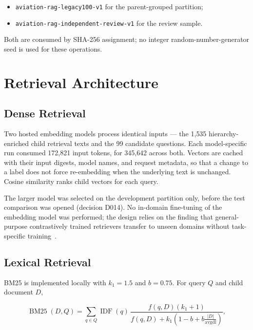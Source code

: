\begin{itemize}
  \item \texttt{aviation-rag-legacy100-v1} for the parent-grouped partition;
  \item \texttt{aviation-rag-independent-review-v1} for the review sample.
\end{itemize}

\noindent Both are consumed by SHA-256 assignment; no integer random-number-generator seed is used for these operations.

\section{Retrieval Architecture}
\label{sec:method-retrieval}

\subsection{Dense Retrieval}

Two hosted embedding models process identical inputs --- the 1{,}535 hierarchy-enriched child retrieval texts and the 99 candidate questions. Each model-specific run consumed 172{,}821 input tokens, for 345{,}642 across both. Vectors are cached with their input digests, model names, and request metadata, so that a change to a label does not force re-embedding when the underlying text is unchanged. Cosine similarity ranks child vectors for each query.

The larger model was selected on the development partition only, before the test comparison was opened (decision D014). No in-domain fine-tuning of the embedding model was performed; the design relies on the finding that general-purpose contrastively trained retrievers transfer to unseen domains without task-specific training~\cite{izacard2022contriever}.

\subsection{Lexical Retrieval}

BM25 is implemented locally with $k_1=1.5$ and $b=0.75$. For query $Q$ and child document $D$,

\begin{equation}
\operatorname{BM25}(D,Q) =
\sum_{q \in Q}
\operatorname{IDF}(q)\,
\frac{f(q,D)(k_1+1)}
     {f(q,D)+k_1\left(1-b+b\frac{|D|}{\operatorname{avgdl}}\right)},
\label{eq:bm25}
\end{equation}

